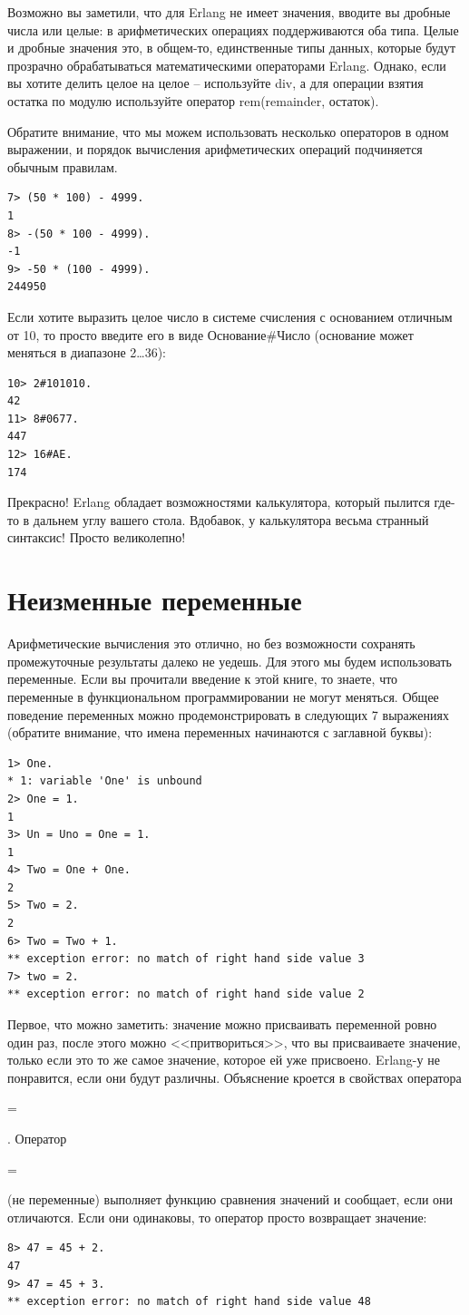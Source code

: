 \documentclass[a4paper,12pt]{report}
\newcommand{\ops}{\colorbox{lgreen}}
\begin{document}
Возможно вы заметили, что для Erlang не имеет значения, вводите вы дробные числа или целые: в арифметических операциях поддерживаются оба типа. Целые и дробные значения это, в общем\--то, единственные типы данных, которые будут прозрачно обрабатываться математическими операторами Erlang. Однако, если вы хотите делить целое на целое \--- используйте \ops{div}, а для операции взятия остатка по модулю используйте оператор \ops{rem}(remainder, остаток).

Обратите внимание, что мы можем использовать несколько операторов в одном выражении, и порядок вычисления арифметических операций подчиняется обычным правилам.
\begin{lstlisting}[style=repl]
7> (50 * 100) - 4999.
1
8> -(50 * 100 - 4999).
-1
9> -50 * (100 - 4999).
244950
\end{lstlisting}

Если хотите выразить целое число в системе счисления с основанием отличным от 10, то просто введите его в виде \ops{Основание\#Число} (основание может меняться в диапазоне 2\ldots36):
\begin{lstlisting}[style=repl]
10> 2#101010.
42
11> 8#0677.
447
12> 16#AE.
174
\end{lstlisting}

Прекрасно! Erlang обладает возможностями калькулятора, который пылится где\--то в дальнем углу вашего стола. Вдобавок, у калькулятора весьма странный синтаксис! Просто великолепно!
\section{Неизменные переменные}
\label{invariable_variables}
Арифметические вычисления это отлично, но без возможности сохранять промежуточные результаты далеко не уедешь. Для этого мы будем использовать переменные. Если вы прочитали введение к этой книге, то знаете, что переменные в функциональном программировании не могут меняться. Общее поведение переменных можно продемонстрировать в следующих 7 выражениях (обратите внимание, что имена переменных начинаются с заглавной буквы):
\begin{lstlisting}[style=repl]
1> One.
* 1: variable 'One' is unbound
2> One = 1.
1
3> Un = Uno = One = 1.
1
4> Two = One + One.
2
5> Two = 2.
2
6> Two = Two + 1.
** exception error: no match of right hand side value 3
7> two = 2.
** exception error: no match of right hand side value 2
\end{lstlisting}

Первое, что можно заметить: значение можно присваивать переменной ровно один раз, после этого можно <<притвориться>>, что вы присваиваете значение, только если это то же самое значение, которое ей уже присвоено. Erlang\--у не понравится, если они будут различны. Объяснение кроется в свойствах оператора \ops{\strut=}. Оператор \ops{\strut=} (не переменные) выполняет функцию сравнения значений и сообщает, если они отличаются. Если они одинаковы, то оператор просто возвращает значение:
\begin{lstlisting}[style=repl]
8> 47 = 45 + 2.
47
9> 47 = 45 + 3.
** exception error: no match of right hand side value 48
\end{lstlisting}
\end{document}
